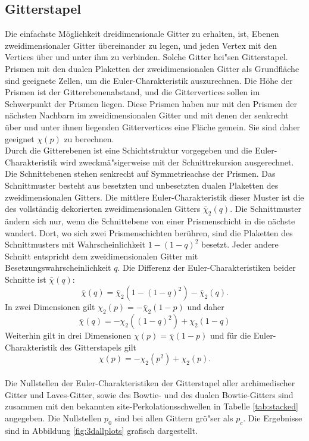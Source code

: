 \subsection{Gitterstapel}
Die einfachste M\"oglichkeit dreidimensionale Gitter zu erhalten, ist, Ebenen zweidimensionaler Gitter \"ubereinander zu legen, und jeden Vertex mit den Vertices \"uber und unter ihm zu verbinden. Solche Gitter hei"sen Gitterstapel.\\
Prismen mit den dualen Plaketten der zweidimensionalen Gitter als Grundfl\"ache sind geeignete Zellen, um die Euler-Charakteristik auszurechnen. Die H\"ohe der Prismen ist der Gitterebenenabstand, und die Gittervertices sollen im Schwerpunkt der Prismen liegen. Diese Prismen haben nur mit den Prismen der n\"achsten Nachbarn im zweidimensionalen Gitter und mit denen der senkrecht \"uber und unter ihnen liegenden Gittervertices eine Fl\"ache gemein. Sie sind daher geeignet $\chi(p)$ zu berechnen. \\
Durch die Gitterebenen ist eine Schichtstruktur vorgegeben und die Euler-Charakteristik wird zweckm\"a"sigerweise mit der Schnittrekursion ausgerechnet. Die Schnittebenen stehen senkrecht auf Symmetrieachse der Prismen. Das Schnittmuster besteht aus besetzten und unbesetzten dualen Plaketten des zweidimensionalen Gitters. Die mittlere Euler-Charakteristik dieser Muster ist die des vollst\"andig dekorierten zweidimensionalen Gitters $\bar{\chi}_{2}(q)$. Die Schnittmuster \"andern sich nur, wenn die Schnittebene von einer Prismenschicht in die n\"achste wandert. Dort, wo sich zwei Prismenschichten ber\"uhren, sind die Plaketten des Schnittmusters mit Wahrscheinlichkeit $1-(1-q)^2$ besetzt. Jeder andere Schnitt entspricht dem zweidimensionalen Gitter mit Besetzungswahrscheinlichkeit $q$. Die Differenz der Euler-Charakteristiken beider Schnitte ist $\bar{\chi}(q)$:
\begin{equation}
  \bar{\chi}(q)=\bar{\chi}_{2}(1-(1-q)^2)-\bar{\chi}_{2}(q).
\end{equation}
In zwei Dimensionen gilt $\chi_2(p)=-\bar{\chi}_2(1-p)$ und daher
\begin{equation}
  \bar{\chi}(q)=-\chi_{2}((1-q)^2)+\chi_{2}(1-q)
\end{equation}
Weiterhin gilt in drei Dimensionen $\chi(p)=\bar{\chi}(1-p)$ und f\"ur die Euler-Charakteristik des Gitterstapels gilt
\begin{equation}
  \chi(p)=-\chi_{2}(p^2)+\chi_{2}(p).
\end{equation} \\
Die Nullstellen der Euler-Charakteristiken der Gitterstapel aller archimedischer Gitter und Laves-Gitter, sowie des Bowtie- und des dualen Bowtie-Gitters sind zusammen mit den bekannten site-Perkolationsschwellen in Tabelle \ref{tab:stacked} angegeben. Die Nullstellen $p_0$ sind bei allen Gittern gr\"o"ser als $p_c$. Die Ergebnisse sind in Abbildung \ref{fig:3dallplots} grafisch dargestellt. 
